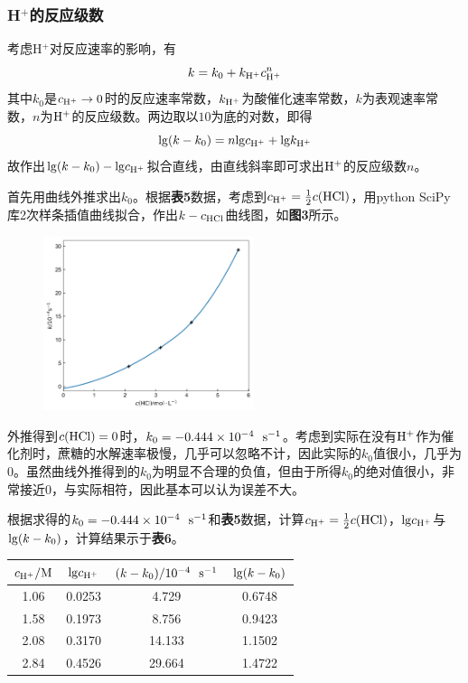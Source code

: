 \documentclass[12pt]{article}
\begin{document}
\subsubsection{H$^{+}$的反应级数}
考虑H$^{+}$对反应速率的影响，有
$$
k=k_{0}+k_{\rm H^{+}}c^{n}_{\rm H^{+}}
$$
其中$k_{0}$是$c_{\rm H^{+}}\rightarrow0$时的反应速率常数，$k_{\rm H^{+}}$为酸催化速率常数，$k$为表观速率常数，$n$为$\rm H^{+}$的反应级数。两边取以$10$为底的对数，即得
$$
{\rm lg}(k-k_{0})=n{\rm lg}c_{\rm H^{+}}+{\rm lg}k_{\rm H^{+}}
$$
故作出${\rm lg}(k-k_{0})-{\rm lg}c_{\rm H^{+}}$拟合直线，由直线斜率即可求出$\rm H^{+}$的反应级数$n$。\par 
首先用曲线外推求出$k_{0}$。根据\textbf{表5}数据，考虑到$c_{\rm H^{+}}=\frac{1}{2}c({\rm HCl})$，用python SciPy库2次样条插值曲线拟合，作出$k-c_{\rm HCl}$曲线图，如\textbf{图3}所示。
\begin{figure}[h]
	\centering
	\includegraphics[width=0.55\textwidth]{3.jpg}
\end{figure}
\par
外推得到$c({\rm HCl})=0$时，$k_{0}=-0.444\times10^{-4}\ \ {\rm s^{-1}}$。考虑到实际在没有$\rm H^{+}$作为催化剂时，蔗糖的水解速率极慢，几乎可以忽略不计，因此实际的$k_{0}$值很小，几乎为0。虽然曲线外推得到的$k_{0}$为明显不合理的负值，但由于所得$k_{0}$的绝对值很小，非常接近0，与实际相符，因此基本可以认为误差不大。\par 
根据求得的$k_{0}=-0.444\times10^{-4}\ \ {\rm s^{-1}}$和\textbf{表5}数据，计算$c_{\rm H^{+}}=\frac{1}{2}c({\rm HCl})$，${\rm lg}c_{\rm H^{+}}$与${\rm lg}(k-k_{0})$，计算结果示于\textbf{表6}。
\begin{table}[h]
	\centering
	\begin{tabular}{cccc}
		\toprule
		
		$c_{\rm H^{+}} / {\rm M}$ & ${\rm lg}c_{\rm H^{+}}$ & $(k-k_{0})/{\rm 10^{-4} \ \ s^{-1}}$ & ${\rm lg}(k-k_{0})$\\
		\midrule
		1.06 & 0.0253 &  4.729 & 0.6748 \\
		1.58 & 0.1973 &  8.756 &  0.9423\\
		2.08 & 0.3170 & 14.133 & 1.1502 \\
		2.84 & 0.4526 & 29.664 & 1.4722 \\
		\bottomrule
	\end{tabular}
\end{table}
\end{document}
